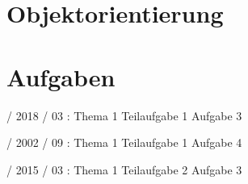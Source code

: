 \documentclass{lehramt-informatik-haupt}
\begin{document}

\chapter{Objektorientierung}


\chapter{Aufgaben}

 / 2018 / 03 : Thema 1 Teilaufgabe 1 Aufgabe 3

%

 / 2002 / 09 : Thema 1 Teilaufgabe 1 Aufgabe 4

%

 / 2015 / 03 : Thema 1 Teilaufgabe 2 Aufgabe 3

\literatur
\end{document}
